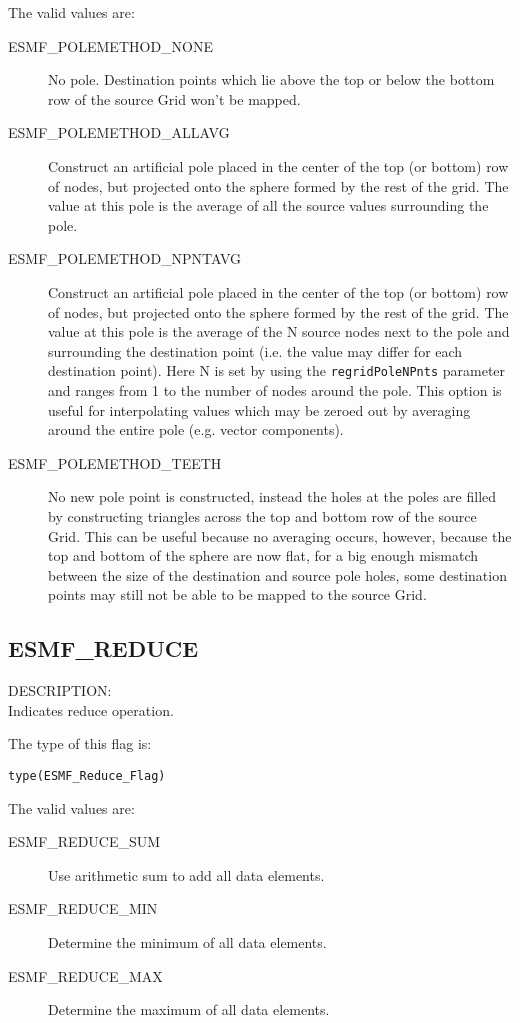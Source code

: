 The valid values are:
\begin{description}
\item [ESMF\_POLEMETHOD\_NONE]
      No pole. Destination points which lie above the top or below the bottom row of the source Grid won't be mapped. 
\item [ESMF\_POLEMETHOD\_ALLAVG]
      Construct an artificial pole placed in the center of the top (or bottom) row of nodes, but projected onto the sphere formed by the rest of the grid. The value at this pole is the average of all the source values surrounding the pole.
\item [ESMF\_POLEMETHOD\_NPNTAVG] Construct an artificial pole placed in the center of the top (or bottom) row of nodes, but projected onto the sphere formed by the rest of the grid. The value at this pole is the average of the N source nodes next to the pole and surrounding the destination point (i.e. the value may differ for each destination point). Here N is set by using the {\tt regridPoleNPnts} parameter and ranges from 1 to the number of nodes around the pole. This option is useful for interpolating values which may be zeroed out by averaging around the entire pole (e.g. vector components). 
\item [ESMF\_POLEMETHOD\_TEETH]
    No new pole point is constructed, instead the holes at the poles are filled by constructing triangles across the top and bottom row of the source Grid. This can be useful because no averaging occurs, however, because the top and bottom of the sphere are now flat, for a big enough mismatch between the size of the destination and source pole holes, some destination points may still not be able to be mapped to the source Grid. 
\end{description}

\subsection{ESMF\_REDUCE}
\label{const:reduce}
{\sf DESCRIPTION:\\}
Indicates reduce operation.

The type of this flag is:

{\tt type(ESMF\_Reduce\_Flag)}

The valid values are:
\begin{description}
   \item [ESMF\_REDUCE\_SUM]
         Use arithmetic sum to add all data elements.
   \item [ESMF\_REDUCE\_MIN]
         Determine the minimum of all data elements.
   \item [ESMF\_REDUCE\_MAX]
         Determine the maximum of all data elements.
\end{description}

